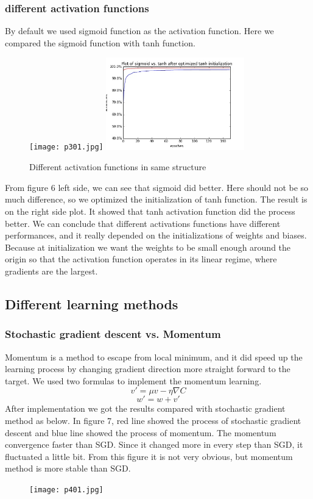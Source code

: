 \documentclass[12pt,a4paper]{article}
\begin{document}
\subsubsection{different activation functions}
By default we used sigmoid function as the activation function. Here we compared the sigmoid function with tanh function.\\
\begin{figure}
\centering
\texttt{[image: p301.jpg]}
\includegraphics[width=60mm,scale=1]{p302.jpg}
\caption{Different activation functions in same structure}
\end{figure}
From figure 6 left side, we can see that sigmoid did better. Here should not be so much difference, so we optimized the initialization of tanh function. The result is on the right side plot. It showed that tanh activation function did the process better. We can conclude that different activations functions have different performances, and it really depended on the initializations of weights and biases. Because at initialization we want the weights to be small enough around the origin so that the activation function operates in its linear regime, where gradients are the largest.

\subsection{Different learning methods}
\subsubsection{Stochastic gradient descent vs. Momentum}
Momentum is a method to escape from local minimum, and it did speed up the learning process by changing gradient direction more straight forward to the target. We used two formulas to implement the momentum learning.
\[v' = \mu v - \eta \nabla C\]
\[w' = w + v'\]
After implementation we got the results compared with stochastic gradient method as below. In figure 7, red line showed the process of stochastic gradient descent and blue line showed the process of momentum. The momentum convergence faster than SGD. Since it changed more in every step than SGD, it fluctuated a little bit. From this figure it is not very obvious, but momentum method is more stable than SGD.\\
\begin{figure}
\centering
\texttt{[image: p401.jpg]}\\
\end{figure}
\end{document}
